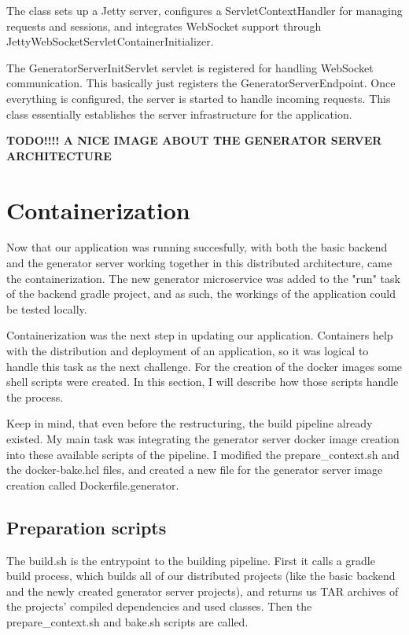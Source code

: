 		The class sets up a Jetty server, configures a ServletContextHandler for managing requests and sessions, 
		and integrates WebSocket support through JettyWebSocketServletContainerInitializer.

		The GeneratorServerInitServlet servlet is registered for handling WebSocket communication.
		This basically just registers the GeneratorServerEndpoint.
		Once everything is configured, the server is started to handle incoming requests. 
		This class essentially establishes the server infrastructure for the application.

		\textbf{TODO!!!! A NICE IMAGE ABOUT THE GENERATOR SERVER ARCHITECTURE}

	\section{Containerization}\label{Containerization}
		Now that our application was running succesfully, with both the basic backend and the generator server working together in this 
		distributed architecture, came the containerization. 
		The new generator microservice was added 
		to the "run" task of the backend gradle project, and as such, the workings of the application could be tested locally. 
		
		Containerization was the next step in 
		updating our application. Containers help with the distribution and deployment of an application, so it was logical to handle this task as the next challenge.
		For the creation of the docker images some shell scripts were created. In this section, I will describe how those scripts handle the process.

		Keep in mind, that even before the restructuring, the build pipeline already existed. My main task was integrating the generator server docker image creation
		into these available scripts of the pipeline. I modified the prepare\_context.sh and the docker-bake.hcl files, and created a new file for the generator server
		image creation called Dockerfile.generator.

		\subsection{Preparation scripts}\label{Preparation scripts}
			The build.sh is the entrypoint to the building pipeline. First it calls a gradle build process, which builds all of our distributed projects 
			(like the basic backend
			and the newly created generator server projects), and returns us TAR archives of the projects' compiled dependencies and used classes.
			Then the prepare\_context.sh and bake.sh scripts are called.

